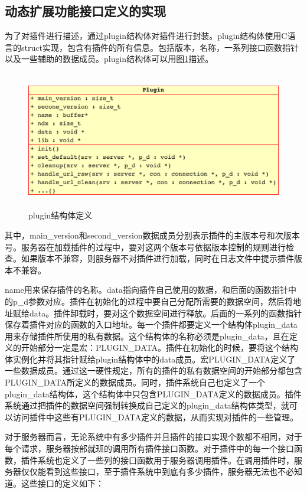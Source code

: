 \documentclass[12pt, twoside, a4paper, xetex]{report}
\begin{document}
\subsection{动态扩展功能接口定义的实现}
	为了对插件进行描述，通过plugin结构体对插件进行封装。plugin结构体使用C语言的struct实现，包含有插件的所有信息。包括版本，名称，一系列接口函数指针以及一些辅助的数据成员。plugin结构体可以用图\ref{plugin_s}描述。
	
	\begin{figure}[htbp]
	\centering
	\caption{plugin结构体定义}
	\label{plugin_s}
	\includegraphics[height=6cm, width=12cm]{pics/plugin_s.eps}
	\end{figure}
	
	其中，main\_version和second\_version数据成员分别表示插件的主版本号和次版本号。服务器在加载插件的过程中，要对这两个版本号依据版本控制的规则进行检查。如果版本不兼容，则服务器不对插件进行加载，同时在日志文件中提示插件版本不兼容。
	
	name用来保存插件的名称。data指向插件自己使用的数据，和后面的函数指针中的p\_d参数对应。插件在初始化的过程中要自己分配所需要的数据空间，然后将地址赋给data。插件卸载时，要对这个数据空间进行释放。后面的一系列的函数指针保存着插件对应的函数的入口地址。每一个插件都要定义一个结构体plugin\_data用来存储插件所使用的私有数据。这个结构体的名称必须是plugin\_data，且在定义的开始部分一定是宏：PLUGIN\_DATA。插件在初始化的时候，要将这个结构体实例化并将其指针赋给plugin结构体中的data成员。宏PLUGIN\_DATA定义了一些数据成员。通过这一硬性规定，所有的插件的私有数据空间的开始部分都包含PLUGIN\_DATA所定义的数据成员。同时，插件系统自己也定义了一个plugin\_data结构体，这个结构体中只包含PLUGIN\_DATA定义的数据成员。插件系统通过把插件的数据空间强制转换成自己定义的plugin\_data结构体类型，就可以访问插件中这些有PLUGIN\_DATA定义的数据，从而实现对插件的一些管理。
	
	对于服务器而言，无论系统中有多少插件并且插件的接口实现个数都不相同，对于每个请求，服务器按部就班的调用所有插件接口函数。对于插件中的每一个接口函数，插件系统也定义了一些列的接口函数用于服务器调用插件。在调用插件时，服务器仅仅能看到这些接口，至于插件系统中到底有多少插件，服务器无法也不必知道。这些接口的定义如下：
	
\end{document}
